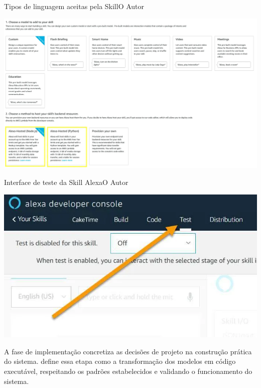 \begin{figura}{Tipos de linguagem aceitas pela Skill}{O Autor}
    \begin{flushleft}
        \label{fig:linguagens-skill}
        \includegraphics[width=0.85\linewidth]{resources/floats/ilustracoes/tipos_linguagem_aceitas_skill.png}
    \end{flushleft}
\end{figura}

\begin{figura}{Interface de teste da Skill Alexa}{O Autor}
    \begin{flushleft}
        \label{fig:teste-skill}
        \includegraphics[width=0.85\linewidth]{resources/floats/ilustracoes/tela_para_testar_skill_criada.png}
    \end{flushleft}
\end{figura}

\label{sssec:implementação}

A fase de implementação concretiza as decisões de projeto na construção prática do sistema. \textcite{sommerville2011} define essa etapa como a transformação dos modelos em código executável, respeitando os padrões estabelecidos e validando o funcionamento do sistema. 

